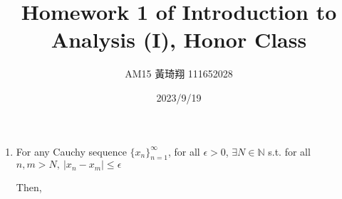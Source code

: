 \documentclass[12pt]{article}
\title{Homework 1 of Introduction to Analysis (I), Honor Class}
\author{AM15 黃琦翔 111652028}
\date{2023/9/19}
\begin{document}
\maketitle
\begin{enumerate}
    \item For any Cauchy sequence $\lbrace x_n\rbrace_{n=1}^\infty$, for all $\epsilon > 0$, $\exists N \in \mathbb{N}$ s.t. for all $n, m > N,\ |x_n - x_m| \leq \epsilon$

    Then, 
\end{enumerate}
\end{document}

